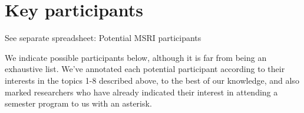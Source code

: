 \documentclass[11pt]{article}
\begin{document}
\section{Key participants}
See separate spreadsheet: Potential MSRI participants

We indicate possible participants below, although it is far from being an exhaustive list. We've annotated each potential participant according to their interests in the topics 1-8 described above, to the best of our knowledge, and also marked researchers who have already indicated their interest in attending a semester program to us with an asterisk.
\end{document}
